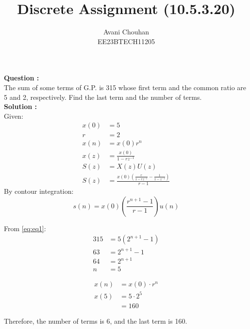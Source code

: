 \documentclass[twocolumn]{article}
\begin{document}
\title{Discrete Assignment (10.5.3.20)}
\author{Avani Chouhan \\
        EE23BTECH11205}
\date{}  %
\maketitle

\textbf{Question : }\\
The sum of some terms of G.P. is 315 whose first term and the common ratio are 5 and 2, respectively. Find the last term and the number of terms.\\
\textbf{Solution : }\\
Given:
\begin{align}
x(0) &= 5 \\
r &= 2 \\
x(n) &= x(0)r^n\\
x(z) &= \frac{x(0)}{1-rz^{-1}}\\
S(z) &= X(z)U(z)\\
S(z) &= \frac{x(0)(\frac{r}{1-rz^{-1}}-\frac{1}{1-z^{-1}})}{r-1}
\end{align}
By contour integration:
\begin{equation}
s(n) = x(0)\left(\frac{r^{n+1}-1}{r-1}\right)u(n)
\label{eq:eq1}
\end{equation}

From \eqref{eq:eq1}:
\begin{align}
315 &= 5(2^{n+1}- 1)  \\
63 &= 2^{n+1}-1  \\
64 &= 2^{n+1} \\
n &= 5
\end{align}

\begin{align}
x(n) &= x(0) \cdot r^{n}\\
x(5) &= 5 \cdot 2^{5} \\
 &= 160 
\end{align}

Therefore, the number of terms is 6, and the last term is 160.
\end{document}
